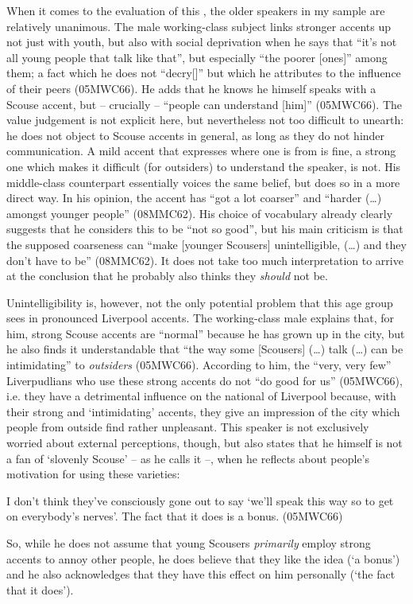 When it comes to the evaluation of this , the older speakers in my sample are relatively unanimous.
The male working-class subject links stronger accents up not just with youth, but also with social deprivation when he says that ``it's not all young people that talk like that'', but especially ``the poorer [ones]'' among them; a fact which he does not ``decry[]'' but which he attributes to the influence of their peers (05MWC66).
He adds that he knows he himself speaks with a Scouse accent, but -- crucially -- ``people can understand [him]'' (05MWC66).
The value judgement is not explicit here, but nevertheless not too difficult to unearth: he does not object to Scouse accents in general, as long as they do not hinder communication.
A mild accent that expresses where one is from is fine, a strong one which makes it difficult (for outsiders) to understand the speaker, is not.
His middle-class counterpart essentially voices the same belief, but does so in a more direct way.
In his opinion, the accent has ``got a lot coarser'' and ``harder (\ldots) amongst younger people'' (08MMC62).
His choice of vocabulary already clearly suggests that he considers this to be ``not so good'', but his main criticism is that the supposed coarseness can ``make [younger Scousers] unintelligible, (\ldots) and they don't have to be'' (08MMC62).
It does not take too much interpretation to arrive at the conclusion that he probably also thinks they \emph{should} not be.

Unintelligibility is, however, not the only potential problem that this age group sees in pronounced Liverpool accents.
The working-class male explains that, for him, strong Scouse accents are ``normal'' because he has grown up in the city, but he also finds it understandable that ``the way some [Scousers] (\ldots) talk (\ldots) can be intimidating'' to \emph{outsiders} (05MWC66).
According to him, the ``very, very few'' Liverpudlians who use these strong accents do not ``do good for us'' (05MWC66), i.e. they have a detrimental influence on the national  of Liverpool because, with their strong and `intimidating' accents, they give an impression of the city which people from outside find rather unpleasant.
This speaker is not exclusively worried about external perceptions, though, but also states that he himself is not a fan of `slovenly Scouse' -- as he calls it --, when he reflects about people's motivation for using these varieties: 
\begin{example}
	I don't think they've consciously gone out to say `we'll speak this way so to get on everybody's nerves'. The fact that it does is a bonus. (05MWC66)
\end{example}
So, while he does not assume that young Scousers \emph{primarily} employ strong accents to annoy other people, he does believe that they like the idea (`a bonus') and he also acknowledges that they have this effect on him personally (`the fact that it does').

